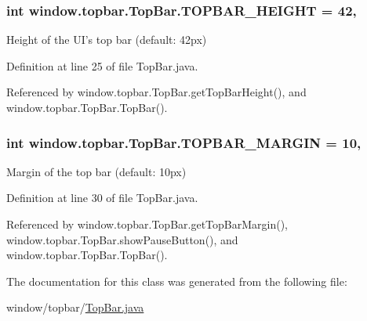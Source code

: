 \hypertarget{classwindow_1_1topbar_1_1_top_bar_aa7100cb3da5276c12e4fae659823bf4e}{
\subsubsection[{T\-O\-P\-B\-A\-R\-\_\-\-H\-E\-I\-G\-H\-T}]{\setlength{\rightskip}{0pt plus 5cm}int window.\-topbar.\-Top\-Bar.\-T\-O\-P\-B\-A\-R\-\_\-\-H\-E\-I\-G\-H\-T = 42\hspace{0.3cm}{\ttfamily [static]}, {\ttfamily [protected]}}}\label{classwindow_1_1topbar_1_1_top_bar_aa7100cb3da5276c12e4fae659823bf4e}


Height of the U\-I's top bar (default\-: 42px) 



Definition at line 25 of file Top\-Bar.\-java.



Referenced by window.\-topbar.\-Top\-Bar.\-get\-Top\-Bar\-Height(), and window.\-topbar.\-Top\-Bar.\-Top\-Bar().

\hypertarget{classwindow_1_1topbar_1_1_top_bar_a8d48486507d36a825223a21b1b6333ac}{
\subsubsection[{T\-O\-P\-B\-A\-R\-\_\-\-M\-A\-R\-G\-I\-N}]{\setlength{\rightskip}{0pt plus 5cm}int window.\-topbar.\-Top\-Bar.\-T\-O\-P\-B\-A\-R\-\_\-\-M\-A\-R\-G\-I\-N = 10\hspace{0.3cm}{\ttfamily [static]}, {\ttfamily [protected]}}}\label{classwindow_1_1topbar_1_1_top_bar_a8d48486507d36a825223a21b1b6333ac}


Margin of the top bar (default\-: 10px) 



Definition at line 30 of file Top\-Bar.\-java.



Referenced by window.\-topbar.\-Top\-Bar.\-get\-Top\-Bar\-Margin(), window.\-topbar.\-Top\-Bar.\-show\-Pause\-Button(), and window.\-topbar.\-Top\-Bar.\-Top\-Bar().



The documentation for this class was generated from the following file\-:\begin{DoxyCompactItemize}
\item 
window/topbar/\hyperlink{_top_bar_8java}{Top\-Bar.\-java}\end{DoxyCompactItemize}
